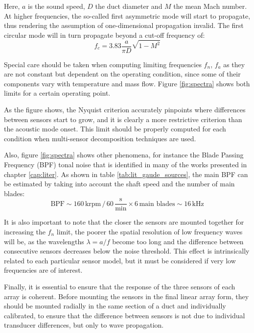 Here, $a$ is the sound speed, $D$ the duct diameter and $M$ the mean Mach number. At higher frequencies, the so-called first asymmetric mode will start to propagate, thus rendering the assumption of one-dimensional propagation invalid. The first circular mode will in turn propagate beyond a cut-off frequency of:
\begin{equation}\label{eq:f_modes_circ}
f_c = 3.83 \frac{a}{\pi D}\sqrt{1-M^2}
\end{equation}

Special care should be taken when computing limiting frequencies $f_n$, $f_a$ as they are not constant but dependent on the operating condition, since some of their components vary with temperature and mass flow. Figure \ref{fig:spectra} shows both limits for a certain operating point.

As the figure shows, the Nyquist criterion accurately pinpoints where differences between sensors start to grow, and it is clearly a more restrictive criterion than the acoustic mode onset. This limit should be properly computed for each condition when multi-sensor decomposition techniques are used.

Also, figure \ref{fig:spectra} shows other phenomena, for instance the Blade Passing Frequency (BPF) tonal noise that is identified in many of the works presented in chapter \ref{cap:liter}. As shown in table \ref{tab:lit_gaude_sources}, the main BPF can be estimated by taking into account the shaft speed and the number of main blades:
\begin{equation}
  \text{BPF} \sim 160\,\text{krpm}\,/\,60\,\frac{\text{s}}{\text{min}} \times 6\,\text{main blades} \sim 16\,\text{kHz}
\end{equation}

It is also important to note that the closer the sensors are mounted together for increasing the $f_n$ limit, the poorer the spatial resolution of low frequency waves will be, as the wavelengths $\lambda=a/f$ become too long and the difference between consecutive sensors decreases below the noise threshold. This effect is intrinsically related to each particular sensor model, but it must be considered if very low frequencies are of interest.

Finally, it is essential to ensure that the response of the three sensors of each array is coherent. Before mounting the sensors in the final linear array form, they should be mounted radially in the same section of a duct and individually calibrated, to ensure that the difference between sensors is not due to individual transducer differences, but only to wave propagation.

